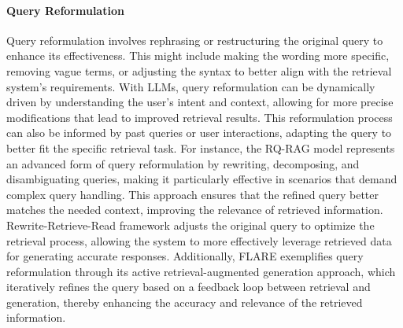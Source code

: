 \paragraph{Query Reformulation} Query reformulation involves rephrasing or restructuring the original query to enhance its effectiveness. This might include making the wording more specific, removing vague terms, or adjusting the syntax to better align with the retrieval system's requirements. With LLMs, query reformulation can be dynamically driven by understanding the user's intent and context, allowing for more precise modifications that lead to improved retrieval results. This reformulation process can also be informed by past queries or user interactions, adapting the query to better fit the specific retrieval task. For instance, the RQ-RAG \cite{chan2024rqrag} model represents an advanced form of query reformulation by rewriting, decomposing, and disambiguating queries, making it particularly effective in scenarios that demand complex query handling. This approach ensures that the refined query better matches the needed context, improving the relevance of retrieved information. Rewrite-Retrieve-Read framework \cite{ma2023query} adjusts the original query to optimize the retrieval process, allowing the system to more effectively leverage retrieved data for generating accurate responses. Additionally, FLARE \cite{jiang2023active} exemplifies query reformulation through its active retrieval-augmented generation approach, which iteratively refines the query based on a feedback loop between retrieval and generation, thereby enhancing the accuracy and relevance of the retrieved information.

